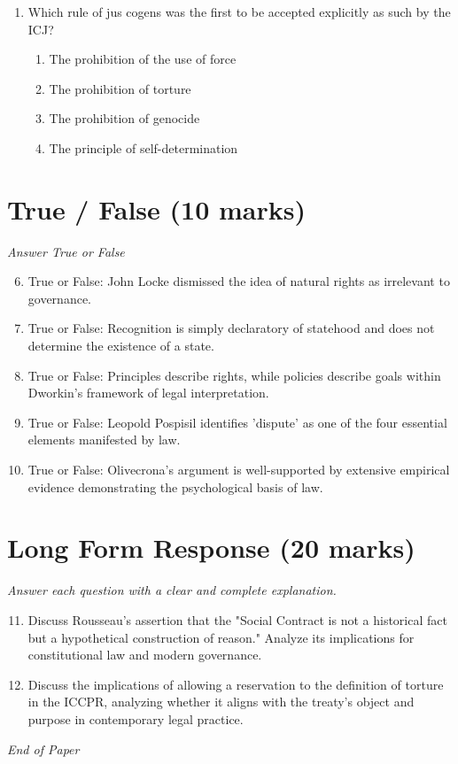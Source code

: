 \documentclass[12pt]{article}
\begin{document}
\begin{enumerate}[label=\arabic*.]
\begin{enumerate}[label=(\alph*)]
    \item Being obliged and having an obligation
    \item Corporeal and incorporeal rights
\end{enumerate}
\item Which rule of jus cogens was the first to be accepted explicitly as such by the ICJ?
\begin{enumerate}[label=(\alph*)]
    \item The prohibition of the use of force
    \item The prohibition of torture
    \item The prohibition of genocide
    \item The principle of self-determination
\end{enumerate}
\end{enumerate}

\section*{True / False (10 marks)}
\textit{Answer True or False}
\begin{enumerate}[label=\arabic*.]
\setcounter{enumi}{5}
\item True or False: John Locke dismissed the idea of natural rights as irrelevant to governance.
\item True or False: Recognition is simply declaratory of statehood and does not determine the existence of a state.
\item True or False: Principles describe rights, while policies describe goals within Dworkin's framework of legal interpretation.
\item True or False: Leopold Pospisil identifies 'dispute' as one of the four essential elements manifested by law.
\item True or False: Olivecrona's argument is well-supported by extensive empirical evidence demonstrating the psychological basis of law.
\end{enumerate}

\section*{Long Form Response (20 marks)}
\textit{Answer each question with a clear and complete explanation.}
\begin{enumerate}[label=\arabic*.]
\setcounter{enumi}{10}
\item Discuss Rousseau's assertion that the "Social Contract is not a historical fact but a hypothetical construction of reason." Analyze its implications for constitutional law and modern governance.
\item Discuss the implications of allowing a reservation to the definition of torture in the ICCPR, analyzing whether it aligns with the treaty's object and purpose in contemporary legal practice.
\end{enumerate}

\vfill
\noindent\textit{End of Paper}
\end{document}
